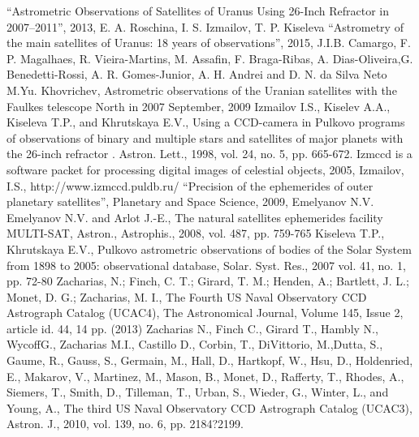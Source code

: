 \documentclass[]{article}
\begin{document}
\begin{thebibliography}{99}
 \textquotedblleft Astrometric Observations of Satellites of Uranus Using 26-Inch Refractor in 2007--2011\textquotedblright, 2013, E. A. Roschina, I. S. Izmailov, T. P. Kiseleva
  \textquotedblleft Astrometry of the main satellites of Uranus: 18 years of observations\textquotedblright, 2015, J.I.B. Camargo, F. P. Magalhaes, R. Vieira-Martins, M. Assafin, F. Braga-Ribas, A. Dias-Oliveira,G. Benedetti-Rossi, A. R. Gomes-Junior, A. H. Andrei and D. N. da Silva Neto
 M.Yu. Khovrichev, Astrometric observations of the Uranian satellites with the Faulkes telescope North in 2007 September, 2009
 Izmailov I.S., Kiselev A.A., Kiseleva T.P., and Khrutskaya E.V., Using a CCD-camera in Pulkovo programs of observations of binary and multiple stars and satellites of major planets with the 26-inch refractor . Astron. Lett., 1998, vol. 24, no. 5, pp. 665-672.
  Izmccd is a software  packet for processing digital images of celestial objects, 2005, Izmailov, I.S., http://www.izmccd.puldb.ru/
 \textquotedblleft Precision of the ephemerides of outer planetary satellites\textquotedblright, Planetary and Space Science, 2009, Emelyanov N.V.
 Emelyanov N.V. and Arlot J.-E., The natural satellites ephemerides facility MULTI-SAT, Astron., Astrophis., 2008, vol. 487, pp. 759-765
 Kiseleva T.P., Khrutskaya E.V., Pulkovo astrometric observations of bodies of the Solar System from 1898 to 2005: observational database, Solar. Syst. Res., 2007 vol. 41, no. 1, pp. 72-80
 Zacharias, N.; Finch, C. T.; Girard, T. M.; Henden, A.; Bartlett, J. L.; Monet, D. G.; Zacharias, M. I., The Fourth US Naval Observatory CCD Astrograph Catalog (UCAC4), The Astronomical Journal, Volume 145, Issue 2, article id. 44, 14 pp. (2013)
 Zacharias N., Finch C., Girard T., Hambly N., WycoffG., Zacharias M.I., Castillo D., Corbin, T., DiVittorio, M.,Dutta,  S.,  Gaume,  R.,  Gauss,  S.,  Germain,  M., Hall,  D.,  Hartkopf,  W.,  Hsu,  D.,  Holdenried,  E., Makarov,  V.,  Martinez,  M.,  Mason,  B.,  Monet,  D., Rafferty, T., Rhodes, A., Siemers, T., Smith, D., Tilleman, T., Urban, S., Wieder, G., Winter, L., and Young, A., The third US Naval Observatory CCD Astrograph Catalog   (UCAC3), Astron.   J.,   2010,   vol.   139,   no.   6, pp. 2184?2199.
\end{thebibliography}
\end{document}
